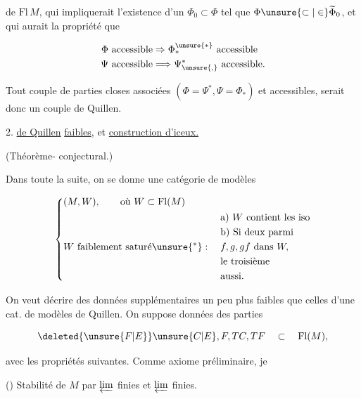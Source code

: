 

de $\mathrm{Fl}\,M$, qui impliquerait l'existence d'un  $\Phi_0\subset\Phi$ tel que $\Phi\unsure{\subset|\in}\widetilde\Phi_0$, et qui aurait la propriété que

\[ \begin{aligned}\Phi\ \text{accessible}&\Rightarrow\Phi_*^{\unsure{*}}\ \text{accessible}\\ \Psi\ \text{accessible}&\Longrightarrow\Psi_{\unsure{,}}^*\ \text{accessible}.\end{aligned} \]

Tout couple \inserted{$(\Phi,\Psi)$} de parties closes  associées \deleted{\unsure{$\Phi=\Psi^*$}} $(\Phi=\Psi^*,\Psi=\Phi_*)$ et accessibles, serait donc un couple de Quillen.

2. \uline{  de Quillen} \uline{faibles}, et \uline{construction d'iceux.}

(Théorème- conjectural.)

Dans toute la suite, on se donne une catégorie de modèles

\[ \left\{\begin{aligned}&(M,W),\qquad\text{où }W\subset\mathrm{Fl}(M)\\ &W\ \text{faiblement saturé}\unsure{^{*}}:\quad\begin{aligned}&\text{a) } W\text{ contient les iso}\\ &\text{b) Si deux parmi}\\ &f,g,gf\text{ dans }W,\\ &\text{le troisième}\\ &\text{aussi.}\end{aligned}\end{aligned}\right. \]


On veut décrire des données supplémentaires un peu plus faibles que celles d'une cat. de modèles de Quillen. On suppose données des parties

\[ \deleted{\unsure{F|E}}\unsure{C|E},F,TC,TF\quad\subset\quad\mathrm{Fl}(M), \]

avec les propriétés suivantes. Comme axiome préliminaire, je 

() Stabilité de $M$ par $\varprojlim$ finies et $\varprojlim$ finies.


